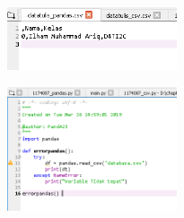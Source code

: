 \begin{figure}[H]
 \includegraphics[width=5cm]{figures/4/1174087/Praktek/datatulis_pandas.png}
 \centering
\end{figure}

\begin{figure}[H]
 \includegraphics[width=5cm]{figures/4/1174087/Praktek/error.png}
 \centering
\end{figure}

